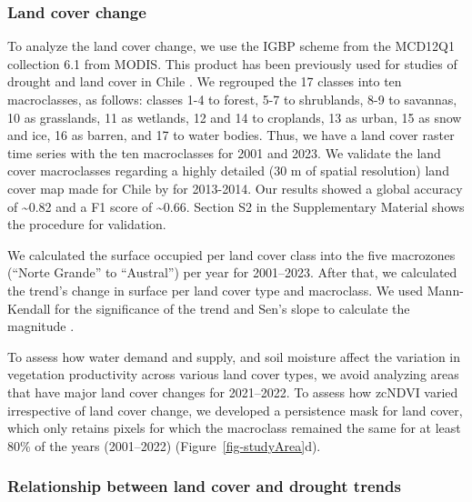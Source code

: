\documentclass[
  authoryear,
  preprint,
  3p,
  onecolumn]{elsarticle}
\begin{document}
\hypertarget{land-cover-change}{%
\subsubsection{Land cover change}\label{land-cover-change}}

To analyze the land cover change, we use the IGBP scheme from the
MCD12Q1 collection 6.1 from MODIS. This product has been previously used
for studies of drought and land cover in Chile
\citep{Fuentes2021, Zambrano2018}. We regrouped the 17 classes into ten
macroclasses, as follows: classes 1-4 to forest, 5-7 to shrublands, 8-9
to savannas, 10 as grasslands, 11 as wetlands, 12 and 14 to croplands,
13 as urban, 15 as snow and ice, 16 as barren, and 17 to water bodies.
Thus, we have a land cover raster time series with the ten macroclasses
for 2001 and 2023. We validate the land cover macroclasses regarding a
highly detailed (30 m of spatial resolution) land cover map made for
Chile by \citet{Zhao2016} for 2013-2014. Our results showed a global
accuracy of \textasciitilde0.82 and a F1 score of \textasciitilde0.66.
Section S2 in the Supplementary Material shows the procedure for
validation.

We calculated the surface occupied per land cover class into the five
macrozones (``Norte Grande'' to ``Austral'') per year for 2001--2023.
After that, we calculated the trend's change in surface per land cover
type and macroclass. We used Mann-Kendall for the significance of the
trend \citep{Kendall1975} and Sen's slope to calculate the magnitude
\citep{Sen1968}.

To assess how water demand and supply, and soil moisture affect the
variation in vegetation productivity across various land cover types, we
avoid analyzing areas that have major land cover changes for 2021--2022.
To assess how zcNDVI varied irrespective of land cover change, we
developed a persistence mask for land cover, which only retains pixels
for which the macroclass remained the same for at least 80\% of the
years (2001--2022) (Figure~\ref{fig-studyArea}d).

\hypertarget{relationship-between-land-cover-and-drought-trends}{%
\subsubsection{Relationship between land cover and drought
trends}\label{relationship-between-land-cover-and-drought-trends}}
\end{document}
